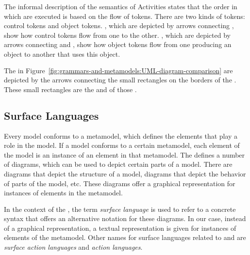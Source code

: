 The informal description of the semantics of Activities states that the order in which \Actions are executed is based on the flow of tokens.
There are two kinds of tokens: control tokens and object tokens.
\ControlFlows, which are depicted by arrows connecting \ActivityNodes, show how control tokens flow from one \ActivityNode to the other.
\ObjectFlows, which are depicted by arrows connecting \OutputPins and \InputPins, show how object tokens flow from one \Action producing an object to another \Action that uses this object.

The \ObjectFlows in Figure~\ref{fig:grammars-and-metamodels:UML-diagram-comparison} are depicted by the arrows connecting the small rectangles on the borders of the \Actions.
These small rectangles are the \InputPins and \OutputPins of those \Actions.


\subsection{Surface Languages}
\label{sub:grammars-and-metamodels:Prelim-SL}

Every model conforms to a metamodel, which defines the elements that play a role in the model.
If a model conforms to a certain metamodel, each element of the model is an instance of an element in that metamodel.
The \UML defines a number of diagrams, which can be used to depict certain parts of a model.
There are diagrams that depict the structure of a model, diagrams that depict the behavior of parts of the model, etc.
These diagrams offer a graphical representation for instances of elements in the metamodel.

In the context of the \UML, the term \emph{surface language} is used to refer to a concrete syntax that offers an alternative notation for these diagrams.
In our case, instead of a graphical representation, a textual representation is given for instances of elements of the metamodel.
Other names for surface languages related to \Activities and \Actions are \emph{surface action languages} and \emph{action languages}. 